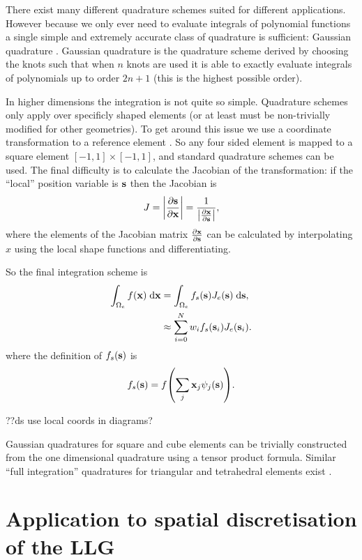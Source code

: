 There exist many different quadrature schemes suited for different applications.
However because we only ever need to evaluate integrals of polynomial functions a single simple and extremely accurate class of quadrature is sufficient: Gaussian quadrature \cite[492]{Kincaid2002}.
Gaussian quadrature is the quadrature scheme derived by choosing the knots such that when $n$ knots are used it is able to exactly evaluate integrals of polynomials up to order $2n + 1$ (this is the highest possible order).

In higher dimensions the integration is not quite so simple.
Quadrature schemes only apply over specificly shaped elements (or at least must be non-trivially modified for other geometries).
To get around this issue we use a coordinate transformation to a reference element \cite[29]{HowardElmanDavidSilvester2006}.
So \eg any four sided element is mapped to a square element $[-1, 1] \times [-1, 1]$, and standard quadrature schemes can be used.
The final difficulty is to calculate the Jacobian of the transformation: if the ``local'' position variable is $\sv$ then the Jacobian is
\begin{equation}
  J = \abs{ \pd{\sv}{\xv}} = \frac{1}{\abs{\pd{\xv}{\sv}}},
\end{equation}
where the elements of the Jacobian matrix $\pd{\xv}{\sv}$ can be calculated by interpolating $x$ using the local shape functions and differentiating.

So the final integration scheme is
\begin{equation}
  \begin{aligned}
    \intdx[\magd_e]{f(\xv)} &= \intds[\magd_e]{f_s(\sv) J_e(\sv)}, \\
    &\approx  \sum_{i=0}^N w_i f_s(\sv_i) J_e(\sv_i).
  \end{aligned}
\end{equation}
where the definition of $f_s(\sv)$ is
\begin{equation}
  f_s(\sv) = f\bigb{\sum_j  \xv_j \sbf_j(\sv)}.
\end{equation}

??ds use local coords in diagrams?

Gaussian quadratures for square and cube elements can be trivially constructed from the one dimensional quadrature using a tensor product formula.
Similar ``full integration'' quadratures for triangular and tetrahedral elements exist \eg \cite{oomph-lib-integral.cc}.




\section{Application to spatial discretisation of the LLG}
\label{sec:llg-initial-equations}

